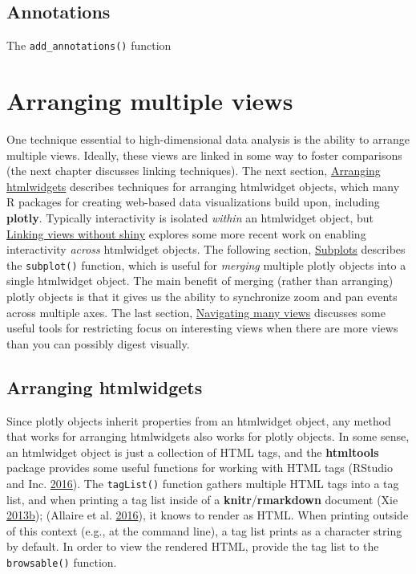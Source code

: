 \documentclass[12pt,]{isuthesis}
\begin{document}
\subsection{Annotations}\label{annotations}

The \texttt{add\_annotations()} function

\hypertarget{arranging-multiple-views}{\section{Arranging multiple
views}\label{arranging-multiple-views}}

One technique essential to high-dimensional data analysis is the ability
to arrange multiple views. Ideally, these views are linked in some way
to foster comparisons (the next chapter discusses linking techniques).
The next section, \protect\hyperlink{arranging-htmlwidgets}{Arranging
htmlwidgets} describes techniques for arranging htmlwidget objects,
which many R packages for creating web-based data visualizations build
upon, including \textbf{plotly}. Typically interactivity is isolated
\emph{within} an htmlwidget object, but
\protect\hyperlink{linking-views-without-shiny}{Linking views without
shiny} explores some more recent work on enabling interactivity
\emph{across} htmlwidget objects. The following section,
\protect\hyperlink{subplots}{Subplots} describes the \texttt{subplot()}
function, which is useful for \emph{merging} multiple plotly objects
into a single htmlwidget object. The main benefit of merging (rather
than arranging) plotly objects is that it gives us the ability to
synchronize zoom and pan events across multiple axes. The last section,
\protect\hyperlink{navigating-many-views}{Navigating many views}
discusses some useful tools for restricting focus on interesting views
when there are more views than you can possibly digest visually.

\hypertarget{arranging-htmlwidgets}{\subsection{Arranging
htmlwidgets}\label{arranging-htmlwidgets}}

Since plotly objects inherit properties from an htmlwidget object, any
method that works for arranging htmlwidgets also works for plotly
objects. In some sense, an htmlwidget object is just a collection of
HTML tags, and the \textbf{htmltools} package provides some useful
functions for working with HTML tags (RStudio and Inc.
\protect\hyperlink{ref-htmltools}{2016}). The \texttt{tagList()}
function gathers multiple HTML tags into a tag list, and when printing a
tag list inside of a \textbf{knitr}/\textbf{rmarkdown} document (Xie
\protect\hyperlink{ref-knitr}{2013}\protect\hyperlink{ref-knitr}{b});
(Allaire et al. \protect\hyperlink{ref-rmarkdown}{2016}), it knows to
render as HTML. When printing outside of this context (e.g., at the
command line), a tag list prints as a character string by default. In
order to view the rendered HTML, provide the tag list to the
\texttt{browsable()} function.
\end{document}
